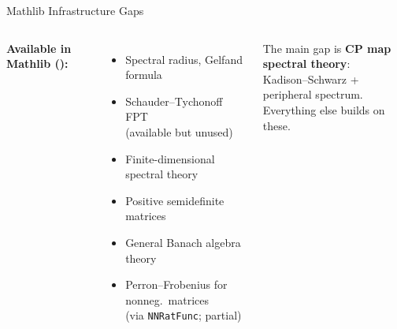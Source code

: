 \documentclass[aspectratio=169,10pt]{beamer}
\begin{document}
\begin{frame}{Mathlib Infrastructure Gaps}
\begin{columns}[T]
        \textbf{\textcolor{leangreen}{Available in Mathlib} (\checkmark):}
        \begin{itemize}\itemsep0.15em\small
            \item[\textcolor{leangreen}{\checkmark}] Spectral radius, Gelfand formula
            \item[\textcolor{leangreen}{\checkmark}] Schauder--Tychonoff FPT\\
                  {\tiny (available but unused)}
            \item[\textcolor{leangreen}{\checkmark}] Finite-dimensional spectral theory
            \item[\textcolor{leangreen}{\checkmark}] Positive semidefinite matrices
            \item[\textcolor{leangreen}{\checkmark}] General Banach algebra theory
            \item[\textcolor{leangreen}{\checkmark}] Perron--Frobenius for nonneg.\ matrices\\
                  {\tiny (via \texttt{NNRatFunc}; partial)}
        \end{itemize}

        \vspace{0.4em}
        \colorbox{cardbg}{\parbox{0.93\columnwidth}{\centering\scriptsize
        \textcolor{dimwhite}{The main gap is \textbf{CP map spectral theory}:\\
        Kadison--Schwarz + peripheral spectrum.\\
        Everything else builds on these.}}}
    \end{columns}
\end{frame}
\end{document}

